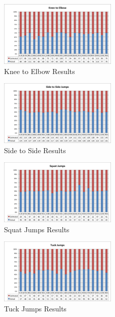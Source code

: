 \begin{figure} [h!]
	\includegraphics[width=0.5\textwidth]{images/kneetoelbow}
\caption{Knee to Elbow Results}
\end{figure}
\begin{figure} [h!]
	\includegraphics[width=0.5\textwidth]{images/sidetoside}
\caption{Side to Side Results}
\end{figure}
\begin{figure} [h!]
	\includegraphics[width=0.5\textwidth]{images/squatjumps}
\caption{Squat Jumps Results}
\end{figure}
\begin{figure} [h!]
	\includegraphics[width=0.5\textwidth]{images/tuckjumps}
\caption{Tuck Jumps Results}
\end{figure}